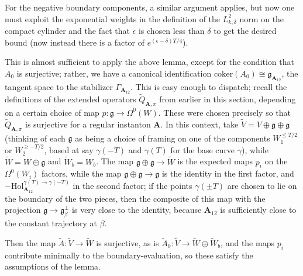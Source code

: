 \documentclass[10pt,a4paper]{amsart}
\theoremstyle{definition}
\theoremstyle{remark}
\numberwithin{figure}{qchap}
\begin{document}
For the negative boundary components, a similar argument applies, but now one must exploit the exponential weights in the definition of the $L^2_{k,\delta}$ norm on the compact cylinder and the fact that $\epsilon$ is chosen less than $\delta$ to get the desired bound (now instead there is a factor of $e^{(\epsilon - \delta)T/4}$).

This is almost sufficient to apply the above lemma, except for the condition that $A_0$ is surjective; rather, we have a canonical identification $\text{coker}(A_0) \cong \mathfrak g_{\mathbf{A}_{12}}$, the tangent space to the stabilizer $\Gamma_{\mathbf{A}_{12}}$. This is easy enough to dispatch; recall the definitions of the extended operators $\widetilde{Q}_{\mathbf{A},\pi}$ from earlier in this section, depending on a certain choice of map $p: \mathfrak g \to \Omega^0(W)$. These were chosen precisely so that $\widetilde Q_{\mathbf{A},\pi}$ is surjective for a regular instanton $\mathbf{A}$. In this context, take $\widetilde V = V \oplus \mathfrak g \oplus \mathfrak g$ (thinking of each $\mathfrak g$ as being a choice of framing on one of the components $W_1^{\leq T/2}$ or $W_2^{\geq -T/2}$, based at say $\gamma(-T)$ and $\gamma(T)$ for the base curve $\gamma$), while $\widetilde W = W \oplus \mathfrak g$ and $\widetilde W_b = W_b$. The map $\mathfrak g \oplus \mathfrak g \to \widetilde W$ is the expected maps $p_i$ on the $\Omega^0(W_i)$ factors, while the map $\mathfrak g \oplus \mathfrak g \to \mathfrak g$ is the identity in the first factor, and $-\text{Hol}^{\gamma(T) \to \gamma(-T)}_{\mathbf{A}_{12}}$ in the second factor; if the points $\gamma(\pm T)$ are chosen to lie on the boundary of the two pieces, then the composite of this map with the projection $\mathfrak g \to \mathfrak g_\beta^\perp$ is very close to the identity, because $\mathbf{A}_{12}$ is sufficiently close to the constant trajectory at $\beta$.

Then the map $\widetilde A: \widetilde V \to \widetilde W$ is surjective, as is $\widetilde A_0: \widetilde V \to \widetilde W \oplus \widetilde W_b$, and the maps $p_i$ contribute minimally to the boundary-evaluation, so these satisfy the assumptions of the lemma.
\end{document}
